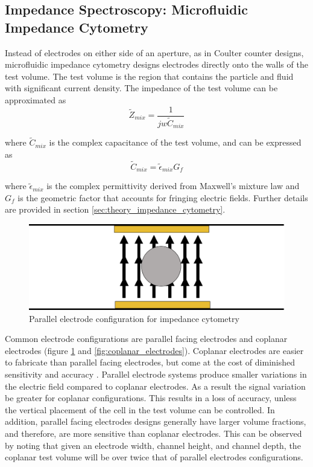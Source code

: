  \subsection*{Impedance Spectroscopy: Microfluidic Impedance Cytometry}
 \par Instead of electrodes on either side of an aperture, as in Coulter counter designs, microfluidic impedance cytometry designs electrodes directly onto the walls of the test volume. The test volume is the region that contains the particle and fluid with significant current density. The impedance of the test volume can be approximated as 
 \begin{equation}
       \tilde{Z}_{mix} = \frac{1}{jw\tilde{C}_{mix}}
    \label{eqn:impedance_with_cap}
 \end{equation}
 
 \noindent where $\tilde{C}_{mix}$ is the complex capacitance of the test volume, and can be expressed as
 \begin{equation}
     \tilde{C}_{mix} = \tilde{\epsilon}_{mix}G_f
 \end{equation}
 
 \noindent where $\tilde{\epsilon}_{mix}$ is the complex permittivity derived from Maxwell's mixture law and $G_f$ is the geometric factor that accounts for fringing electric fields. Further details are provided in section \ref{sec:theory_impedance_cytometry}.
 
 \begin{figure}[ht]
     \centering
     \includegraphics[width=\textwidth]{images/parallel.png}
     \caption{Parallel electrode configuration for impedance cytometry}
     \label{fig:parallel_electrodes}
 \end{figure}
 
 \par Common electrode configurations are parallel facing electrodes and coplanar electrodes (figure \ref{fig:parallel_electrodes} and \ref{fig:coplanar_electrodes}). Coplanar electrodes are easier to fabricate than parallel facing electrodes, but come at the cost of diminished sensitivity and accuracy \cite{sun_analytical_2007}. Parallel electrode systems produce smaller variations in the electric field compared to coplanar electrodes. As a result the signal variation be greater for coplanar configurations. This results in a loss of accuracy, unless the vertical placement of the cell in the test volume can be controlled. In addition, parallel facing electrodes designs generally have larger volume fractions, and therefore, are more sensitive than coplanar electrodes. This can be observed by noting that given an electrode width, channel height, and channel depth, the coplanar test volume will be over twice that of parallel electrodes configurations.
  
